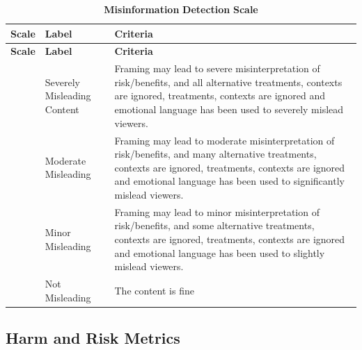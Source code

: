 \documentclass[]{article}
\begin{document}
\begin{longtable}[]{@{}
  >{\raggedright\arraybackslash}p{}
  >{\raggedright\arraybackslash}p{}
  >{\raggedright\arraybackslash}p{}@{}}
\caption{\textbf{Misinformation}
\textbf{Detection} \textbf{Scale}}\tabularnewline
\toprule\noalign{}
\begin{minipage}[b]{\linewidth}\raggedright
\textbf{Scale}
\end{minipage} & \begin{minipage}[b]{\linewidth}\raggedright
\textbf{Label}
\end{minipage} & \begin{minipage}[b]{\linewidth}\raggedright
\textbf{Criteria}
\end{minipage} \\
\midrule\noalign{}
\endfirsthead
\toprule\noalign{}
\begin{minipage}[b]{\linewidth}\raggedright
\textbf{Scale}
\end{minipage} & \begin{minipage}[b]{\linewidth}\raggedright
\textbf{Label}
\end{minipage} & \begin{minipage}[b]{\linewidth}\raggedright
\textbf{Criteria}
\end{minipage} \\
\midrule\noalign{}
\endhead
\bottomrule\noalign{}
\endlastfoot
0 & Severely Misleading Content & Framing may lead to severe misinterpretation
of risk/benefits, and all alternative treatments, contexts are ignored,
treatments, contexts are ignored and emotional language has been used to
severely mislead viewers. \\
1 & Moderate Misleading  & Framing may lead to moderate misinterpretation
of risk/benefits, and many alternative treatments, contexts are ignored,
treatments, contexts are ignored and emotional language has been used to
significantly mislead viewers. \\
2 &  Minor Misleading & Framing may lead to minor misinterpretation of
risk/benefits, and some alternative treatments, contexts are ignored,
treatments, contexts are ignored and emotional language has been used to
slightly mislead viewers. \\
3 & Not Misleading &  The content is fine\\
\end{longtable}

\subsection{Harm and Risk Metrics}
\end{document}
